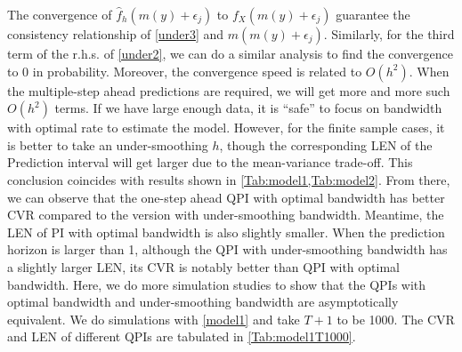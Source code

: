 \documentclass[a4paper]{article}
\begin{document}
 The convergence of $\widehat{f}_{h}(m(y)+\epsilon_j)$ to $f_{X}(m(y)+\epsilon_j)$ guarantee the consistency relationship of \cref{under3} and $ m(m(y)+\epsilon_{j})$. Similarly, for the third term of the r.h.s. of \cref{under2}, we can do a similar analysis to find the convergence to 0 in probability. Moreover, the convergence speed is related to $O(h^2)$. When the multiple-step ahead predictions are required, we will get more and more such $O(h^2)$ terms. If we have large enough data, it is ``safe'' to focus on bandwidth with optimal rate to estimate the model. However, for the finite sample cases, it is better to take an under-smoothing $h$, though the corresponding LEN of the Prediction interval will get larger due to the mean-variance trade-off. This conclusion coincides with results shown in \cref{Tab:model1,Tab:model2}. From there, we can observe that the one-step ahead QPI with optimal bandwidth has better CVR compared to the version with under-smoothing bandwidth. Meantime, the LEN of PI with optimal bandwidth is also slightly smaller. When the prediction horizon is larger than 1, although the QPI with under-smoothing bandwidth has a slightly larger LEN, its CVR is notably better than QPI with optimal bandwidth. Here, we do more simulation studies to show that the QPIs with optimal bandwidth and under-smoothing bandwidth are asymptotically equivalent. We do simulations with \cref{model1} and take $T+1$ to be 1000. The CVR and LEN of different QPIs are tabulated in \cref{Tab:model1T1000}.  
\end{document}
